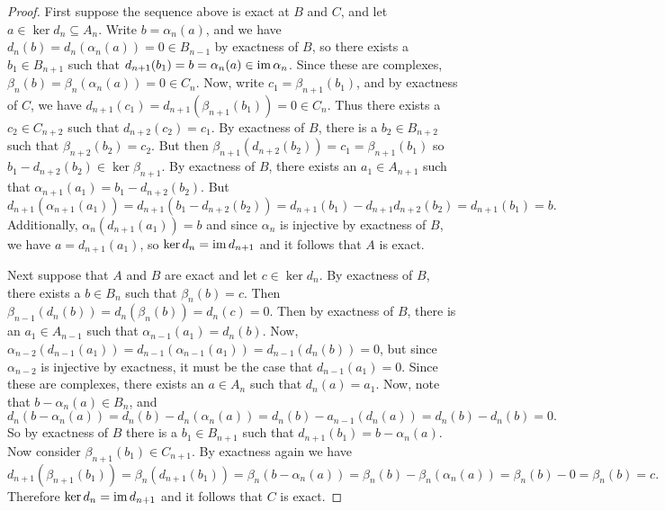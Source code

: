 \documentclass[11pt,oneside,english]{amsart}
\theoremstyle{definition}
\newcommand{\im}{\text{im\,}}
\begin{document}
\begin{enumerate}[leftmargin=*]
\begin{proof}
{\linespread{2}
First suppose the sequence above is exact at $B$ and $C$, and let $a\in \ker d_n\subseteq A_n$. Write $b=\alpha_n(a)$, and we have $d_n(b)=d_n(\alpha_n(a))=0\in B_{n-1}$ by exactness of $B$, so there exists a $b_1\in B_{n+1}$ such that $d_{n+1}(b_1)=b=\alpha_n(a)\in\im\alpha_n$. Since these are complexes, $\beta_n(b)=\beta_n(\alpha_n(a))=0\in C_n$. Now, write $c_1=\beta_{n+1}(b_1)$, and by exactness of $C$, we have $d_{n+1}(c_1)=d_{n+1}(\beta_{n+1}(b_1))=0\in C_n$. Thus there exists a $c_2\in C_{n+2}$ such that $d_{n+2}(c_2)=c_1$. By exactness of $B$, there is a $b_2\in B_{n+2}$ such that $\beta_{n+2}(b_2)=c_2$. But then $\beta_{n+1}(d_{n+2}(b_2))=c_1=\beta_{n+1}(b_1)$ so $b_1-d_{n+2}(b_2)\in \ker \beta_{n+1}$. By exactness of $B$, there exists an $a_1\in A_{n+1}$ such that $\alpha_{n+1}(a_1)=b_1-d_{n+2}(b_2)$. But
\[
d_{n+1}(\alpha_{n+1}(a_1))=d_{n+1}(b_1-d_{n+2}(b_2))=d_{n+1}(b_1)-d_{n+1}d_{n+2}(b_2)=d_{n+1}(b_1)=b.
\]
Additionally, $\alpha_n(d_{n+1}(a_1))=b$ and since $\alpha_n$ is injective by exactness of $B$, we have $a=d_{n+1}(a_1)$, so $\ker d_n=\im d_{n+1}$ and it follows that $A$ is exact.

Next suppose that $A$ and $B$ are exact and let $c\in \ker d_n$. By exactness of $B$, there exists a $b\in B_n$ such that $\beta_n(b)=c$. Then $\beta_{n-1}(d_n(b))=d_n(\beta_n(b))=d_n(c)=0$. Then by exactness of $B$, there is an $a_1\in A_{n-1}$ such that $\alpha_{n-1}(a_1)=d_{n}(b)$. Now, $\alpha_{n-2}(d_{n-1}(a_1))=d_{n-1}(\alpha_{n-1}(a_1))=d_{n-1}(d_n(b))=0$, but since $\alpha_{n-2}$ is injective by exactness, it must be the case that $d_{n-1}(a_1)=0$. Since these are complexes, there exists an $a\in A_n$ such that $d_{n}(a)=a_1$. Now, note that $b-\alpha_n(a)\in B_n$, and
\[
d_n(b-\alpha_n(a))=d_n(b)-d_n(\alpha_n(a))=d_n(b)-a_{n-1}(d_n(a))=d_n(b)-d_n(b)=0.
\]
So by exactness of $B$ there is a $b_1\in B_{n+1}$ such that $d_{n+1}(b_1)=b-\alpha_n(a)$. Now consider $\beta_{n+1}(b_1)\in C_{n+1}$. By exactness again we have 
\[
d_{n+1}(\beta_{n+1}(b_1))=\beta_n(d_{n+1}(b_1))=\beta_n(b-\alpha_n(a))=\beta_n(b)-\beta_n(\alpha_n(a))=\beta_n(b)-0=\beta_n(b)=c.
\]
Therefore $\ker d_n=\im d_{n+1}$ and it follows that $C$ is exact.
}
\end{proof}

\pagebreak


\end{enumerate}
\end{document}
